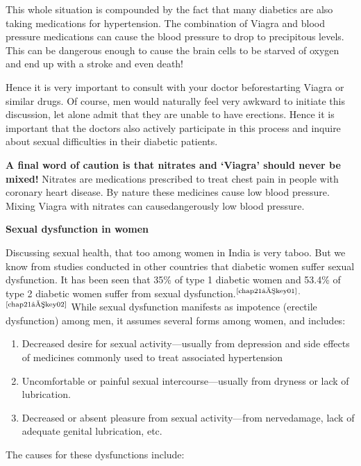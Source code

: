 This whole situation is compounded by the fact that many diabe\-tics are also taking medications for hypertension. The combination of Viagra and blood pressure medications can cause the blood pressure to drop to precipitous levels. This can be dangerous enough to cause the brain cells to be starved of oxygen and end up with a stroke and even death!

Hence it is very important to consult with your doctor before\break starting Viagra or similar drugs. Of course, men would naturally feel very awkward to initiate this discussion, let alone admit that they are unable to have erections. Hence it is important that the doctors also actively participate in this process and inquire about sexual difficulties in their diabetic patients.

\textbf{A final word of caution is that nitrates and ‘Viagra’ should never be mixed!} Nitrates are medications prescribed to treat chest pain in people with coronary heart disease. By nature these medicines cause low blood pressure. Mixing Viagra with nitrates can cause\break dangerously low blood pressure.

\noindent\textbf{Sexual dysfunction in women}

Discussing sexual health, that too among women in India is very taboo. But we know from studies conducted in other countries that diabetic women suffer sexual dysfunction. It has been seen that 35\% of type 1 diabetic women and 53.4\% of type 2 diabetic women suffer from sexual dysfunction.$^{\text{\cite{chap21–key01}}}$$^,$$^{\text{\cite{chap21–key02}}}$ While sexual dysfunction manifests as impotence (erectile dysfunction) among men, it assumes several forms among women, and includes:

\vspace{-\topsep}
\begin{enumerate}[•]
\itemsep=0pt
\item Decreased desire for sexual activity—usually from depression and side effects of medicines commonly used to treat associated hypertension
\item Uncomfortable or painful sexual intercourse—usually from dryness or lack of lubrication.
\item Decreased or absent pleasure from sexual activity—from nerve\break damage, lack of adequate genital lubrication, etc.
\end{enumerate}
\vspace{-\topsep}

\noindent The causes for these dysfunctions include:

